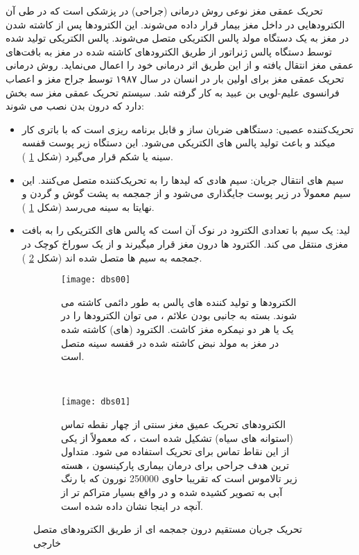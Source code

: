 تحریک عمقی مغز
 نوعی روش درمانی (جراحی) در پزشکی است که در طی آن الکترودهایی در داخل مغز بیمار قرار داده می‌شوند. این الکترودها پس از کاشته شدن در مغز به یک دستگاه مولد پالس الکتریکی
  متصل می‌شوند. پالس الکتریکی تولید شده توسط دستگاه پالس ژنراتور از طریق الکترودهای کاشته شده در مغز به بافت‌های عمقی مغز انتقال یافته و از این طریق اثر درمانی خود را اعمال می‌نماید. روش درمانی تحریک عمقی مغز برای اولین بار در انسان در سال ۱۹۸۷ توسط جراح مغز و اعصاب فرانسوی علیم-لویی بن عبید
به کار گرفته شد. سیستم تحریک عمقی مغز سه بخش دارد که درون بدن نصب می شوند:
\begin{itemize}
\item تحریک‌کننده عصبی: دستگاهی ضربان ساز و قابل برنامه ریزی است که با باتری کار میکند و باعث تولید پالس های الکتریکی می‌شود. این دستگاه زیر پوست قفسه سینه یا شکم قرار می‌گیرد (شکل 
\ref{fig:dbs00}
).
\item سیم های انتقال جریان: سیم هادی که لیدها را به تحریک‌کننده متصل می‌کنند. این سیم معمولاً در زیر پوست جایگذاری می‌شود و از جمجمه به پشت گوش و گردن و نهایتا به سینه می‌رسد (شکل 
\ref{fig:dbs00}
).
\item لید: یک سیم با تعدادی الکترود در نوک آن است که پالس های الکتریکی را به بافت مغزی منتقل می کند. الکترود ها درون مغز قرار میگیرند و از یک سوراخ کوچک در جمجمه به سیم ها متصل شده اند (شکل 
\ref{fig:dbs01}
).
\end{itemize}

\begin{figure}
    \centering
     \begin{subfigure}[t]{0.45\textwidth}
         \centering
         \texttt{[image: dbs00]}
         \caption{
         الکترودها و تولید کننده های پالس به طور دائمی کاشته می شوند. 
         بسته به جانبی بودن علائم ، می توان الکترودها را در یک یا هر دو نیمکره مغز کاشت.
         الکترود (های) کاشته شده در مغز به مولد نبض کاشته شده در قفسه سینه متصل است.
         }
         \label{fig:dbs00}
     \end{subfigure}
    \
         \begin{subfigure}[t]{0.45\textwidth}
         \centering
         \texttt{[image: dbs01]}
         \caption{  
         الکترودهای تحریک عمیق مغز سنتی از چهار نقطه تماس (استوانه های سیاه) تشکیل شده است ، که
         معمولاً از یکی از این نقاط تماس برای تحریک استفاده می شود.
         متداول ترین هدف جراحی برای درمان بیماری پارکینسون ، هسته زیر تالاموس است که تقریبا حاوی 250000 نورون  که با رنگ آبی به تصویر کشیده شده و در واقع بسیار متراکم تر از آنچه در اینجا نشان داده شده است.
         }
         \label{fig:dbs01}
     \end{subfigure}
     \caption{تحریک جریان مستقیم درون جمجمه ای از طریق الکترودهای متصل خارجی }
    \label{fig:dbs}
\end{figure}

